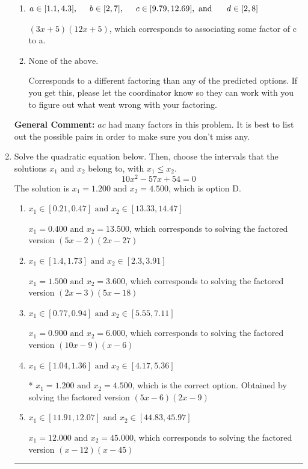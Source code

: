 \documentclass{extbook}[14pt]
\newcommand{\litem}[1]{\item #1

\rule{\textwidth}{0.4pt}}
\begin{document}
\begin{enumerate}
{\begin{enumerate}[label=\Alph*.]
 $(x + 30)(x + 30)$, which corresponds to factoring $x^{2} +60 x + 900$.
\item \( a \in [1.1, 4.3], \hspace*{5mm} b \in [2, 7], \hspace*{5mm} c \in [9.79, 12.69], \text{ and } \hspace*{5mm} d \in [2, 8] \)

 $(3x + 5)(12x + 5)$, which corresponds to associating some factor of c to a.
\item \( \text{None of the above.} \)

 Corresponds to a different factoring than any of the predicted options. If you get this, please let the coordinator know so they can work with you to figure out what went wrong with your factoring.
\end{enumerate}

\textbf{General Comment:} $ac$ had many factors in this problem. It is best to list out the possible pairs in order to make sure you don't miss any.
}
\litem{
Solve the quadratic equation below. Then, choose the intervals that the solutions $x_1$ and $x_2$ belong to, with $x_1 \leq x_2$.
\[ 10x^{2} -57 x + 54 = 0 \]The solution is \( x_1 = 1.200 \text{ and } x_2 = 4.500 \), which is option D.\begin{enumerate}[label=\Alph*.]
\item \( x_1 \in [0.21, 0.47] \text{ and } x_2 \in [13.33, 14.47] \)

$x_1 = 0.400 \text{ and } x_2 = 13.500$, which corresponds to solving the factored version $(5x -2)(2x -27)$
\item \( x_1 \in [1.4, 1.73] \text{ and } x_2 \in [2.3, 3.91] \)

$x_1 = 1.500 \text{ and } x_2 = 3.600$, which corresponds to solving the factored version $(2x -3)(5x -18)$
\item \( x_1 \in [0.77, 0.94] \text{ and } x_2 \in [5.55, 7.11] \)

$x_1 = 0.900 \text{ and } x_2 = 6.000$, which corresponds to solving the factored version $(10x -9)(x -6)$
\item \( x_1 \in [1.04, 1.36] \text{ and } x_2 \in [4.17, 5.36] \)

* $x_1 = 1.200 \text{ and } x_2 = 4.500$, which is the correct option. Obtained by solving the factored version $(5x -6)(2x -9)$
\item \( x_1 \in [11.91, 12.07] \text{ and } x_2 \in [44.83, 45.97] \)

$x_1 = 12.000 \text{ and } x_2 = 45.000$, which corresponds to solving the factored version $(x -12)(x -45)$
\end{enumerate}

}
\end{enumerate}
\end{document}
